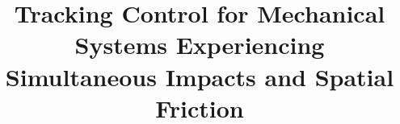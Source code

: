 \newcommand{\mytitle}{Tracking Control for Mechanical Systems Experiencing Simultaneous Impacts and Spatial Friction}
\title{\mytitle}






\pagestyle{plain} %




\pagestyle{plain}
\tableofcontents









\cleartooddpage
{}









